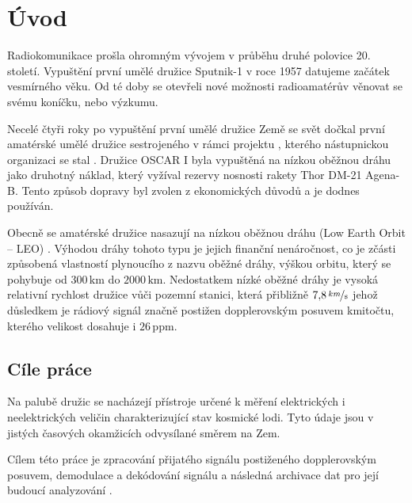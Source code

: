 \chapter*{Úvod}
{}

Radiokomunikace prošla ohromným vývojem v průběhu druhé polovice 20. století. Vypuštění první umělé družice Sputnik-1 v roce 1957 datujeme začátek vesmírného věku. Od té doby se otevřeli nové možnosti radioamatérův věnovat se svému koníčku, nebo výzkumu.

Necelé čtyři roky po vypuštění první umělé družice Země se svět dočkal první amatérské umělé družice sestrojeného v rámci projektu  \cite{wiki:amateur_sat}, kterého nástupnickou organizaci se stal  \cite{wiki:AMSAT}. Družice OSCAR I byla vypuštěná na nízkou oběžnou dráhu jako druhotný náklad, který vyžíval rezervy nosnosti rakety  Thor DM-21 Agena-B. Tento způsob dopravy byl zvolen z ekonomických důvodů a je dodnes používán.

Obecně se amatérské družice nasazují na nízkou oběžnou dráhu (Low Earth Orbit -- LEO) \cite{book:ARRL_handbook}. Výhodou dráhy tohoto typu je jejich finanční nenáročnost, co je zčásti způsobená vlastností plynoucího z nazvu oběžné dráhy, výškou orbitu, který se pohybuje od $300\,\mathrm{km}$ do $2000\,\mathrm{km}$. Nedostatkem nízké oběžné dráhy je vysoká relativní rychlost družice vůči pozemní stanici, která přibližně $7{,}8\,\mathrm{\nicefrac{km}{s}}$ \cite{wiki:LEO} jehož důsledkem je rádiový signál značně postižen dopplerovským posuvem kmitočtu, kterého velikost dosahuje i $26\,\mathrm{ppm}$.

\section*{Cíle práce}
{}
Na palubě družic se nacházejí přístroje určené k měření elektrických i neelektrických veličin charakterizující stav kosmické lodi. Tyto údaje jsou v jistých časových okamžicích odvysílané směrem na Zem.

Cílem této práce je zpracování přijatého signálu postiženého dopplerovským posuvem, demodulace a dekódování signálu a následná archivace dat pro její budoucí analyzování .
